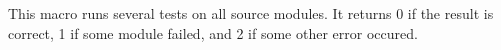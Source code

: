 This macro runs several tests on all source modules.
It returns 0 if the result is correct, 1 if some module
failed, and 2 if some other error occured.
